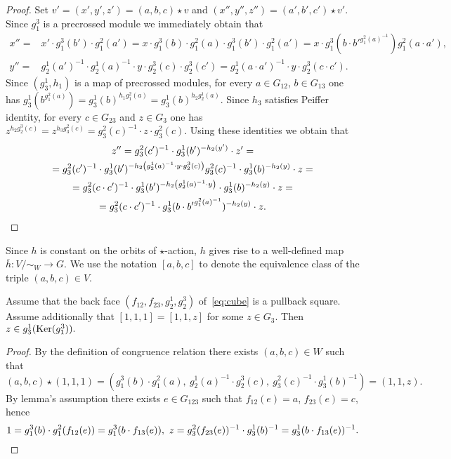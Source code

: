\begin{proof}
    Set $v'=(x', y', z') = (a, b, c) \star v$ and $(x'', y'', z'') = (a', b', c') \star v'$.
    Since $g_1^3$ is a precrossed module we immediately obtain that
    \begin{align*}
        x'' =& x' \cdot g_1^3(b') \cdot g_1^2(a') = x \cdot g_1^3(b) \cdot g_1^2(a) \cdot g_1^3(b') \cdot g_1^2(a') = x \cdot g_1^3(b \cdot b'^{g_1^2(a)^{-1}}) g_1^2(a \cdot a'),\\
        y'' =& g_2^1(a')^{-1} \cdot g_2^1(a)^{-1} \cdot y \cdot g_2^3(c) \cdot g_2^3(c') = g_2^1(a\cdot a')^{-1} \cdot y \cdot g_2^{3}(c\cdot c'). \end{align*}
    Since $(g_3^1, h_1)$ is a map of precrossed modules, for every $a \in G_{12}$, $b \in G_{13}$ one has $g_3^1(b^{g_1^2(a)}) = g_3^1(b)^{h_1 g_1^2(a)} = g_3^1(b)^{h_2g_2^1(a)}$.
    Since $h_3$ satisfies Peiffer identity, for every $c \in G_{23}$ and $z \in G_3$ one has $z ^{h_2 g_2^3(c)} = z^{ h_3 g_3^2(c)} = g_3^2(c)^{-1} \cdot z \cdot g_3^2(c)$.
    Using these identities we obtain that
    \begin{multline*}
        z'' = g_3^2(c')^{-1} \cdot g_3^1(b')^{-h_2(y')} \cdot z' = \\
        = g_3^2(c')^{-1} \cdot g_3^1(b')^{- h_2 \left( g_2^1(a)^{-1} \cdot y \cdot g_2^3(c) \right)} g_3^2(c)^{-1} \cdot g_3^1(b)^{-h_2(y)} \cdot z = \\
        = g_3^2(c \cdot c')^{-1} \cdot g_3^1(b')^{- h_2 \left( g_2^1(a)^{-1} \cdot y \right)} \cdot g_3^1(b)^{-h_2(y)} \cdot z = \\
        = g_3^2(c \cdot c')^{-1} \cdot g_3^1(b \cdot {b'} ^ {g_1^2(a)^{-1}})^{- h_2 \left( y \right)} \cdot z. \qedhere
    \end{multline*}
\end{proof}
Since $h$ is constant on the orbits of $\star$-action, $h$ gives rise to a well-defined map $\overline{h} \colon V/\sim_W \to G$.
We use the notation $[a, b, c]$ to denote the equivalence class of the triple $(a, b, c) \in V$.

\begin{lemma}\label{lem:one-one-z} Assume that the back face $(f_{12}, f_{23}, g_2^1, g_2^3)$ of~\eqref{eq:cube} is a pullback square.
Assume additionally that $[1, 1, 1] = [1, 1, z]$ for some $z\in G_3$.
Then $z \in g_3^1(\operatorname{Ker}(g_1^3)).$ \end{lemma}
\begin{proof} By the definition of congruence relation there exists $(a, b, c)\in W$ such that
\[ (a, b, c) \star (1, 1, 1) = ( g_1^3(b) \cdot g_1^2(a),\ g_2^1(a)^{-1} \cdot g_2^3(c),\ g_3^2(c)^{-1} \cdot g_3^1(b)^{-1}) = (1,1,z). \]
By lemma's assumption there exists $e \in G_{123}$ such that $f_{12}(e) = a$, $f_{23}(e) = c$, hence
\[ 1 = g_1^3(b) \cdot g_1^2(f_{12}(e)) = g_1^3(b \cdot f_{13}(e)),\ z = g_3^2(f_{23}(e))^{-1} \cdot g_3^1(b)^{-1} = g_3^1(b \cdot f_{13}(e))^{-1}. \qedhere\] \end{proof}


